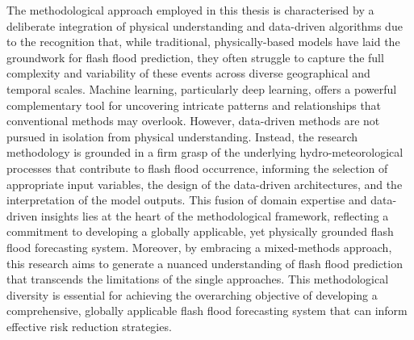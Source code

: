 The methodological approach employed in this thesis is characterised by a deliberate integration of physical understanding and data-driven algorithms due to the recognition that, while traditional, physically-based models have laid the groundwork for flash flood prediction, they often struggle to capture the full complexity and variability of these events across diverse geographical and temporal scales. Machine learning, particularly deep learning, offers a powerful complementary tool for uncovering intricate patterns and relationships that conventional methods may overlook. However, data-driven methods are not pursued in isolation from physical understanding. Instead, the research methodology is grounded in a firm grasp of the underlying hydro-meteorological processes that contribute to flash flood occurrence, informing the selection of appropriate input variables, the design of the data-driven architectures, and the interpretation of the model outputs. This fusion of domain expertise and data-driven insights lies at the heart of the methodological framework, reflecting a commitment to developing a globally applicable, yet physically grounded flash flood forecasting system. Moreover, by embracing a mixed-methods approach, this research aims to generate a nuanced understanding of flash flood prediction that transcends the limitations of the single approaches. This methodological diversity is essential for achieving the overarching objective of developing a comprehensive, globally applicable flash flood forecasting system that can inform effective risk reduction strategies. 

